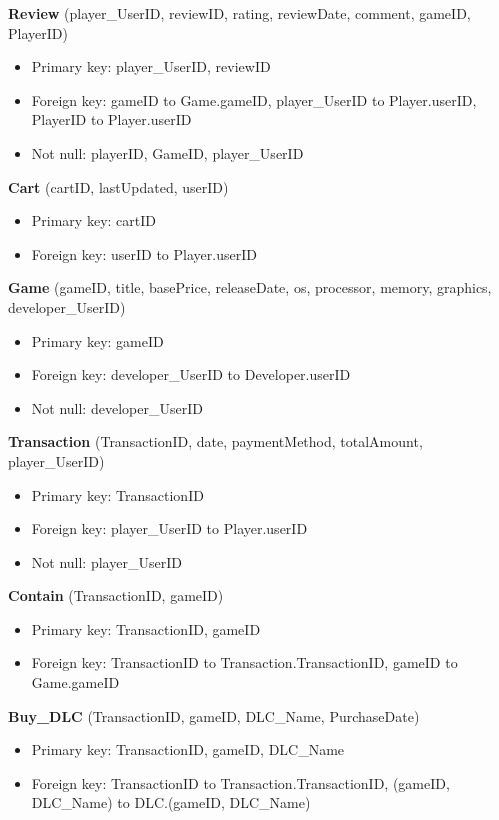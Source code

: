 \noindent\textbf{Review} (player\_UserID, reviewID, rating, reviewDate, comment, gameID, PlayerID)
\begin{itemize}[label=-]
    \item Primary key: player\_UserID, reviewID
    \item Foreign key: gameID to Game.gameID, player\_UserID to Player.userID, PlayerID to Player.userID
    \item Not null: playerID, GameID, player\_UserID
\end{itemize}


\noindent\textbf{Cart} (cartID, lastUpdated, userID)
\begin{itemize}[label=-]
    \item Primary key: cartID
    \item Foreign key: userID to Player.userID
\end{itemize}

\noindent\textbf{Game} (gameID, title, basePrice, releaseDate, os, processor, memory, graphics, developer\_UserID)
\begin{itemize}[label=-]
    \item Primary key: gameID
    \item Foreign key: developer\_UserID to Developer.userID
    \item Not null: developer\_UserID
\end{itemize}

\noindent\textbf{Transaction} (TransactionID, date, paymentMethod, totalAmount, player\_UserID)
\begin{itemize}[label=-]
    \item Primary key: TransactionID
    \item Foreign key: player\_UserID to Player.userID
    \item Not null: player\_UserID
\end{itemize}


\noindent\textbf{Contain} (TransactionID, gameID)
\begin{itemize}[label=-]
    \item Primary key: TransactionID, gameID
    \item Foreign key: TransactionID to Transaction.TransactionID, gameID to Game.gameID
\end{itemize}

\noindent\textbf{Buy\_DLC} (TransactionID, gameID, DLC\_Name, PurchaseDate)
\begin{itemize}[label=-]
    \item Primary key: TransactionID, gameID, DLC\_Name
    \item Foreign key: TransactionID to Transaction.TransactionID, (gameID, DLC\_Name) to DLC.(gameID, DLC\_Name)
\end{itemize}

